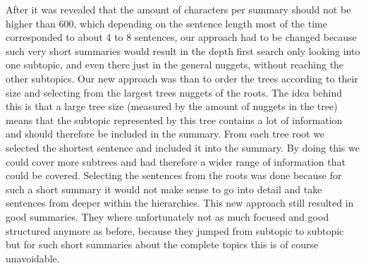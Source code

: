 After it was revealed that the amount of characters per summary should not be
higher than 600, which depending on the sentence length most of the time
corresponded to about 4 to 8 sentences, our approach had to be changed because
such very short summaries
would result in the depth first search only looking into one subtopic, and even
there just in the general nuggets, without reaching the other subtopics. Our new
approach was than to order the trees according to their size and selecting from
the largest trees nuggets of the roots. The idea behind this is that a large tree
size (measured by the amount of nuggets in the tree) means that the subtopic represented by
this tree contains a lot of information and should therefore be included in the
summary. From each tree root we selected the shortest sentence and included it
into the summary. By doing this we could cover more subtrees and had therefore a
wider range of information that could be covered. Selecting the sentences from
the roots was done because for such a short summary it would not make sense to
go into detail and take sentences from deeper within the hierarchies. This new
approach still resulted in good summaries. They where unfortunately not as much focused and
good structured anymore as before, because they jumped from subtopic to subtopic
but for such short summaries about the complete topics this is of course unavoidable.